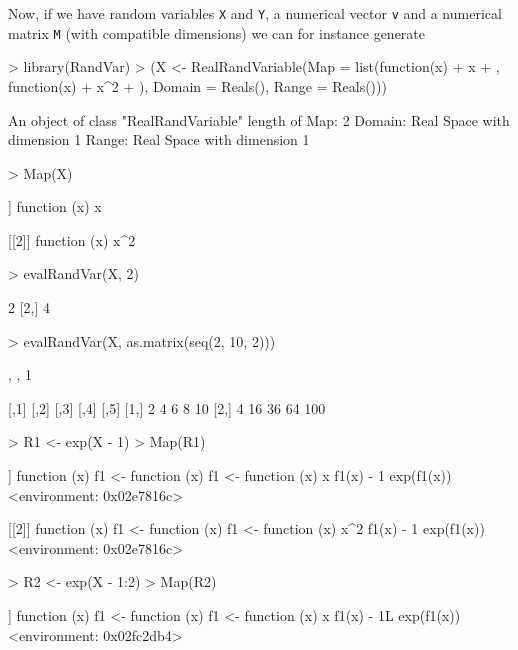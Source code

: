 \documentclass[11pt]{article}
\begin{document}
Now, if we have random variables {\tt X} and {\tt Y}, a numerical
vector {\tt v} and a numerical matrix {\tt M} (with compatible dimensions)
we can for instance generate
\begin{Schunk}
\begin{Sinput}
> library(RandVar)
> (X <- RealRandVariable(Map = list(function(x) {
+     x
+ }, function(x) {
+     x^2
+ }), Domain = Reals(), Range = Reals()))
\end{Sinput}
\begin{Soutput}
An object of class "RealRandVariable" 
length of Map:	 2 
Domain:	Real Space with dimension 1 
Range:	Real Space with dimension 1 
\end{Soutput}
\begin{Sinput}
> Map(X)
\end{Sinput}
\begin{Soutput}
[[1]]
function (x) 
{
    x
}

[[2]]
function (x) 
{
    x^2
}
\end{Soutput}
\begin{Sinput}
> evalRandVar(X, 2)
\end{Sinput}
\begin{Soutput}
     [,1]
[1,]    2
[2,]    4
\end{Soutput}
\begin{Sinput}
> evalRandVar(X, as.matrix(seq(2, 10, 2)))
\end{Sinput}
\begin{Soutput}
, , 1

     [,1] [,2] [,3] [,4] [,5]
[1,]    2    4    6    8   10
[2,]    4   16   36   64  100
\end{Soutput}
\begin{Sinput}
> R1 <- exp(X - 1)
> Map(R1)
\end{Sinput}
\begin{Soutput}
[[1]]
function (x) 
{
    f1 <- function (x) 
    {
        f1 <- function (x) 
        {
            x
        }
        f1(x) - 1
    }
    exp(f1(x))
}
<environment: 0x02e7816c>

[[2]]
function (x) 
{
    f1 <- function (x) 
    {
        f1 <- function (x) 
        {
            x^2
        }
        f1(x) - 1
    }
    exp(f1(x))
}
<environment: 0x02e7816c>
\end{Soutput}
\begin{Sinput}
> R2 <- exp(X - 1:2)
> Map(R2)
\end{Sinput}
\begin{Soutput}
[[1]]
function (x) 
{
    f1 <- function (x) 
    {
        f1 <- function (x) 
        {
            x
        }
        f1(x) - 1L
    }
    exp(f1(x))
}
<environment: 0x02fc2db4>


\end{Soutput}
\end{Schunk}
\end{document}
